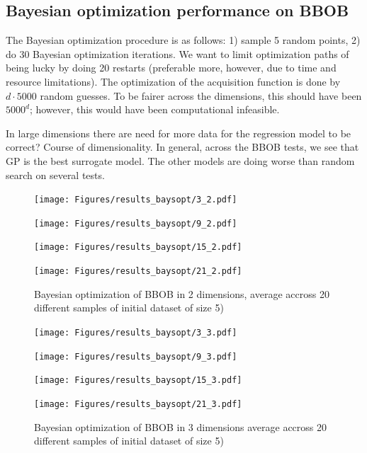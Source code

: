 \subsection{Bayesian optimization performance on BBOB}
The Bayesian optimization procedure is as follows: 1) sample 5 random points, 2) do 30 Bayesian
optimization iterations. We want to limit optimization paths of being lucky by doing 20
restarts (preferable more, however, due to time and resource limitations). The optimization of the
acquisition function is done by $d \cdot 5000$ random guesses. To be fairer across the dimensions,
this should have been $5000^d$; however, this would have been computational infeasible. 

In large dimensions there are need for more data for the regression model to be correct? Course of
dimensionality. In general, across the BBOB tests, we see that GP is the best surrogate model. The
other models are doing worse than random search on several tests.

\begin{figure}[H]
  \centering
  \begin{minipage}[b]{0.49\textwidth}
   \texttt{[image: Figures/results\_baysopt/3\_2.pdf]}
  \end{minipage}
  \hfill
  \begin{minipage}[b]{0.49\textwidth}
    \texttt{[image: Figures/results\_baysopt/9\_2.pdf]}
   \end{minipage}
   \begin{minipage}[b]{0.49\textwidth}
    \texttt{[image: Figures/results\_baysopt/15\_2.pdf]}
   \end{minipage}
   \hfill
   \begin{minipage}[b]{0.49\textwidth}
     \texttt{[image: Figures/results\_baysopt/21\_2.pdf]}
    \end{minipage}
  \caption{Bayesian optimization of BBOB in 2 dimensions, average accross 20 different samples of initial dataset of size 5)}
  \label{BBOB_bayesOpt}
\end{figure}

\begin{figure}[H]
  \centering
  \begin{minipage}[b]{0.49\textwidth}
   \texttt{[image: Figures/results\_baysopt/3\_3.pdf]}
  \end{minipage}
  \hfill
  \begin{minipage}[b]{0.49\textwidth}
    \texttt{[image: Figures/results\_baysopt/9\_3.pdf]}
   \end{minipage}
   \begin{minipage}[b]{0.49\textwidth}
    \texttt{[image: Figures/results\_baysopt/15\_3.pdf]}
   \end{minipage}
   \hfill
   \begin{minipage}[b]{0.49\textwidth}
     \texttt{[image: Figures/results\_baysopt/21\_3.pdf]}
    \end{minipage}
  \caption{Bayesian optimization of BBOB in 3 dimensions average accross 20 different samples of initial dataset of size 5)}
  \label{BBOB_bayesOpt}
\end{figure}


